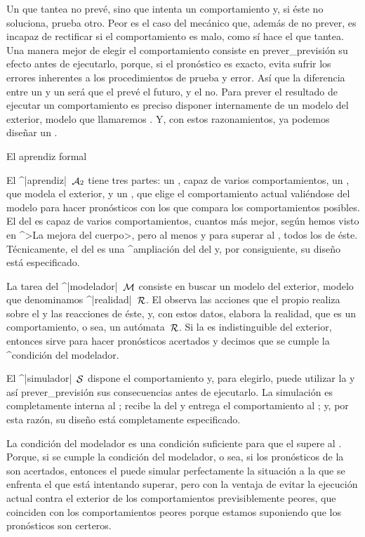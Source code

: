 Un {\gobernador} que tantea no prevé, sino que intenta un comportamiento
y, si éste no soluciona, prueba otro. Peor es el caso del {\gobernador}
mecánico que, además de no prever, es incapaz de rectificar si el
comportamiento es malo, como sí hace el que tantea. Una manera mejor de
elegir el comportamiento consiste en prever_{previsión} su efecto antes
de ejecutarlo, porque, si el pronóstico es exacto, evita sufrir los
errores inherentes a los procedimientos de prueba y error. Así que la
diferencia entre un {\aprendiz} y un {\adaptador} será que el
{\aprendiz} prevé el futuro, y el {\adaptador} no. Para prever el
resultado de ejecutar un comportamiento es preciso disponer internamente
de un modelo del exterior, modelo que llamaremos {\realidad}. Y, con
estos razonamientos, ya podemos diseñar un {\aprendiz}.


\Section El aprendiz formal

El ^|aprendiz|~$\aut A_2$ tiene tres partes: un {\cuerpo}, capaz de
varios comportamientos, un {\modelador}, que modela el exterior, y un
{\simulador}, que elige el comportamiento actual valiéndose del modelo
para hacer pronósticos con los que compara los comportamientos posibles.
\beginpoints
\point El {\cuerpo} del {\aprendiz} es capaz de varios comportamientos,
cuantos más mejor, según hemos visto en ^>La mejora del cuerpo>, pero al
menos y para superar al {\adaptador}, todos los de éste. Técnicamente,
el {\cuerpo} del {\aprendiz} es una ^{ampliación} del {\cuerpo} del
{\adaptador} y, por consiguiente, su diseño está especificado.

\point La tarea del ^|modelador|~$\aut M$ consiste en buscar un modelo
del {\universo} exterior, modelo que denominamos ^|realidad|~$\aut R$.
El {\modelador} observa las acciones que el propio {\aprendiz} realiza
sobre el {\universo} y las reacciones de éste, y, con estos datos,
elabora la realidad, que es un comportamiento, o sea, un autómata~$\aut
R$. Si la {\realidad} es indistinguible del {\universo} exterior,
entonces sirve para hacer pronósticos acertados y decimos que se cumple
la ^{condición del modelador}.

\point El ^|simulador|~$\aut S$ dispone el comportamiento y, para
elegirlo, puede utilizar la {\realidad} y así prever_{previsión} sus
consecuencias antes de ejecutarlo. La simulación es completamente
interna al {\aprendiz}; recibe la {\realidad} del {\modelador} y entrega
el comportamiento al {\cuerpo}; y, por esta razón, su diseño está
completamente especificado.

\noindent La condición del modelador es una condición suficiente para
que el {\aprendiz} supere al {\adaptador}. Porque, si se cumple la
condición del modelador, o sea, si los pronósticos de la {\realidad} son
acertados, entonces el {\aprendiz} puede simular perfectamente la
situación a la que se enfrenta el {\adaptador} que está intentando
superar, pero con la ventaja de evitar la ejecución actual contra el
{\universo} exterior de los comportamientos previsiblemente peores, que
coinciden con los comportamientos peores porque estamos suponiendo que
los pronósticos son certeros.
\endpoints

